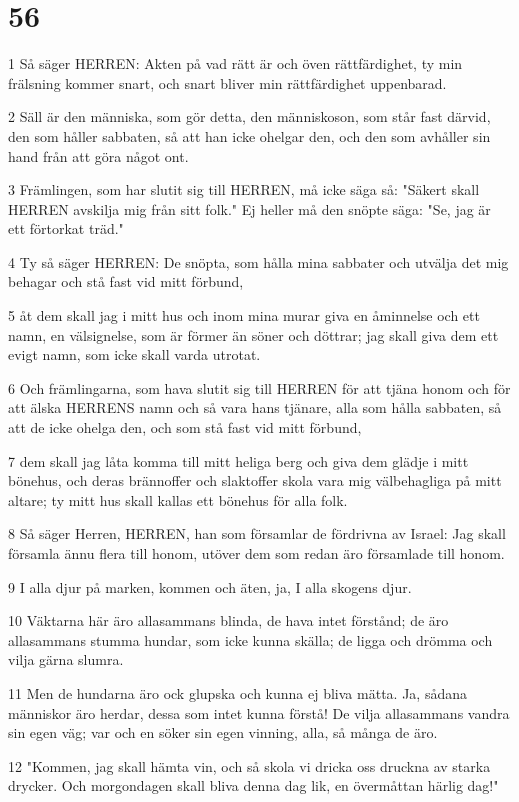 \chapter{56}

\par 1 Så säger HERREN: Akten på vad rätt är och öven rättfärdighet, ty min frälsning kommer snart, och snart bliver min rättfärdighet uppenbarad.
\par 2 Säll är den människa, som gör detta, den människoson, som står fast därvid, den som håller sabbaten, så att han icke ohelgar den, och den som avhåller sin hand från att göra något ont.
\par 3 Främlingen, som har slutit sig till HERREN, må icke säga så: "Säkert skall HERREN avskilja mig från sitt folk." Ej heller må den snöpte säga: "Se, jag är ett förtorkat träd."
\par 4 Ty så säger HERREN: De snöpta, som hålla mina sabbater och utvälja det mig behagar och stå fast vid mitt förbund,
\par 5 åt dem skall jag i mitt hus och inom mina murar giva en åminnelse och ett namn, en välsignelse, som är förmer än söner och döttrar; jag skall giva dem ett evigt namn, som icke skall varda utrotat.
\par 6 Och främlingarna, som hava slutit sig till HERREN för att tjäna honom och för att älska HERRENS namn och så vara hans tjänare, alla som hålla sabbaten, så att de icke ohelga den, och som stå fast vid mitt förbund,
\par 7 dem skall jag låta komma till mitt heliga berg och giva dem glädje i mitt bönehus, och deras brännoffer och slaktoffer skola vara mig välbehagliga på mitt altare; ty mitt hus skall kallas ett bönehus för alla folk.
\par 8 Så säger Herren, HERREN, han som församlar de fördrivna av Israel: Jag skall församla ännu flera till honom, utöver dem som redan äro församlade till honom.
\par 9 I alla djur på marken, kommen och äten, ja, I alla skogens djur.
\par 10 Väktarna här äro allasammans blinda, de hava intet förstånd; de äro allasammans stumma hundar, som icke kunna skälla; de ligga och drömma och vilja gärna slumra.
\par 11 Men de hundarna äro ock glupska och kunna ej bliva mätta. Ja, sådana människor äro herdar, dessa som intet kunna förstå! De vilja allasammans vandra sin egen väg; var och en söker sin egen vinning, alla, så många de äro.
\par 12 "Kommen, jag skall hämta vin, och så skola vi dricka oss druckna av starka drycker. Och morgondagen skall bliva denna dag lik, en övermåttan härlig dag!"

